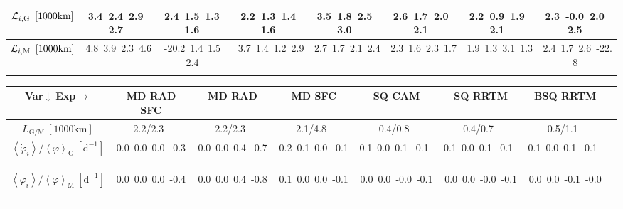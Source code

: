 \begin{table}[H]
{\begin{centering}
\begin{tabular}{|c|c|c|c|c|c|c|c|}
\hline
${\cal L}_{i,\mathrm{G}}\ \left[1000\mathrm{km}\right]$ & \textcolor{C1}{3.4}\ \textcolor{C2}{2.4}\ \textcolor{C3}{2.9}\ \textcolor{C4}{2.7}\  & \textcolor{C1}{2.4}\ \textcolor{C2}{1.5}\ \textcolor{C3}{1.3}\ \textcolor{C4}{1.6}\  & \textcolor{C1}{2.2}\ \textcolor{C2}{1.3}\ \textcolor{C3}{1.4}\ \textcolor{C4}{1.6}\  & \textcolor{C1}{3.5}\ \textcolor{C2}{1.8}\ \textcolor{C3}{2.5}\ \textcolor{C4}{3.0}\  & \textcolor{C1}{2.6}\ \textcolor{C2}{1.7}\ \textcolor{C3}{2.0}\ \textcolor{C4}{2.1}\  & \textcolor{C1}{2.2}\ \textcolor{C2}{0.9}\ \textcolor{C3}{1.9}\ \textcolor{C4}{2.1}\  & \textcolor{C1}{2.3}\ \textcolor{C2}{-0.0}\ \textcolor{C3}{2.0}\ \textcolor{C4}{2.5}\  \tabularnewline
\hline
${\cal L}_{i,\mathrm{M}}\ \left[1000\mathrm{km}\right]$ & \textcolor{C1}{4.8}\ \textcolor{C2}{3.9}\ \textcolor{C3}{2.3}\ \textcolor{C4}{4.6}\  & \textcolor{C1}{-20.2}\ \textcolor{C2}{1.4}\ \textcolor{C3}{1.5}\ \textcolor{C4}{2.4}\  & \textcolor{C1}{3.7}\ \textcolor{C2}{1.4}\ \textcolor{C3}{1.2}\ \textcolor{C4}{2.9}\  & \textcolor{C1}{2.7}\ \textcolor{C2}{1.7}\ \textcolor{C3}{2.1}\ \textcolor{C4}{2.4}\  & \textcolor{C1}{2.3}\ \textcolor{C2}{1.6}\ \textcolor{C3}{2.3}\ \textcolor{C4}{1.7}\  & \textcolor{C1}{1.9}\ \textcolor{C2}{1.3}\ \textcolor{C3}{3.1}\ \textcolor{C4}{1.3}\  & \textcolor{C1}{2.4}\ \textcolor{C2}{1.7}\ \textcolor{C3}{2.6}\ \textcolor{C4}{-22.8}\  \tabularnewline
\hline
 &  &  &  &  &  &  & \tabularnewline
\hline
\end{tabular}
\begin{tabular}{|c|c|c|c|c|c|c|c|}
\hline
Var$\downarrow\ $Exp$\rightarrow$ & MD RAD SFC & MD RAD & MD SFC & SQ CAM & SQ RRTM & BSQ RRTM \tabularnewline
\hline
\hline
$L_{\mathrm{G/M}}\ \left[1000\mathrm{km}\right]$ & 2.2/2.3\ & 2.2/2.3\ & 2.1/4.8\ & 0.4/0.8\ & 0.4/0.7\ & 0.5/1.1\ \tabularnewline
\hline
$\left\langle \dot{\varphi}_{i}\right\rangle /\left\langle \varphi\right\rangle _{\mathrm{G}}\ \left[\mathrm{d^{-1}}\right]$ & \textcolor{C1}{0.0}\ \textcolor{C2}{0.0}\ \textcolor{C3}{0.0}\ \textcolor{C4}{-0.3}\  & \textcolor{C1}{0.0}\ \textcolor{C2}{0.0}\ \textcolor{C3}{0.4}\ \textcolor{C4}{-0.7}\  & \textcolor{C1}{0.2}\ \textcolor{C2}{0.1}\ \textcolor{C3}{0.0}\ \textcolor{C4}{-0.1}\  & \textcolor{C1}{0.1}\ \textcolor{C2}{0.0}\ \textcolor{C3}{0.1}\ \textcolor{C4}{-0.1}\  & \textcolor{C1}{0.1}\ \textcolor{C2}{0.0}\ \textcolor{C3}{0.1}\ \textcolor{C4}{-0.1}\  & \textcolor{C1}{0.1}\ \textcolor{C2}{0.0}\ \textcolor{C3}{0.1}\ \textcolor{C4}{-0.1}\  \tabularnewline
\hline
$\left\langle \dot{\varphi}_{i}\right\rangle /\left\langle \varphi\right\rangle _{\mathrm{M}}\ \left[\mathrm{d^{-1}}\right]$ & \textcolor{C1}{0.0}\ \textcolor{C2}{0.0}\ \textcolor{C3}{0.0}\ \textcolor{C4}{-0.4}\  & \textcolor{C1}{0.0}\ \textcolor{C2}{0.0}\ \textcolor{C3}{0.4}\ \textcolor{C4}{-0.8}\  & \textcolor{C1}{0.1}\ \textcolor{C2}{0.0}\ \textcolor{C3}{0.0}\ \textcolor{C4}{-0.1}\  & \textcolor{C1}{0.0}\ \textcolor{C2}{0.0}\ \textcolor{C3}{-0.0}\ \textcolor{C4}{-0.1}\  & \textcolor{C1}{0.0}\ \textcolor{C2}{0.0}\ \textcolor{C3}{-0.0}\ \textcolor{C4}{-0.1}\  & \textcolor{C1}{0.0}\ \textcolor{C2}{0.0}\ \textcolor{C3}{-0.1}\ \textcolor{C4}{-0.0}\  \tabularnewline

\end{tabular}
\end{centering}}
\end{table}
